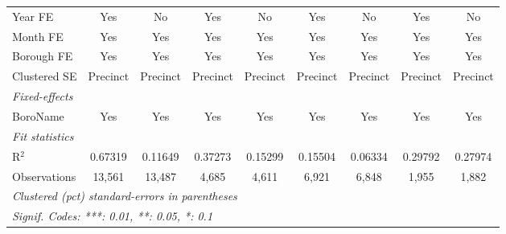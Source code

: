 \begin{tabular}{lcccccccc}
   Year FE      & Yes                                & No                              & Yes                                  & No                                & Yes                                  & No                                & Yes                              & No\\  
   Month FE     & Yes                                & Yes                             & Yes                                  & Yes                               & Yes                                  & Yes                               & Yes                              & Yes\\  
   Borough FE   & Yes                                & Yes                             & Yes                                  & Yes                               & Yes                                  & Yes                               & Yes                              & Yes\\  
   Clustered SE & Precinct                           & Precinct                        & Precinct                             & Precinct                          & Precinct                             & Precinct                          & Precinct                         & Precinct\\  
   \midrule
   \emph{Fixed-effects}\\
   BoroName     & Yes                                & Yes                             & Yes                                  & Yes                               & Yes                                  & Yes                               & Yes                              & Yes\\  
   \midrule
   \emph{Fit statistics}\\
   R$^2$        & 0.67319                            & 0.11649                         & 0.37273                              & 0.15299                           & 0.15504                              & 0.06334                           & 0.29792                          & 0.27974\\  
   Observations & 13,561                             & 13,487                          & 4,685                                & 4,611                             & 6,921                                & 6,848                             & 1,955                            & 1,882\\  
   \midrule \midrule
   \multicolumn{9}{l}{\emph{Clustered (pct) standard-errors in parentheses}}\\
   \multicolumn{9}{l}{\emph{Signif. Codes: ***: 0.01, **: 0.05, *: 0.1}}\\
\end{tabular}
\par\endgroup
